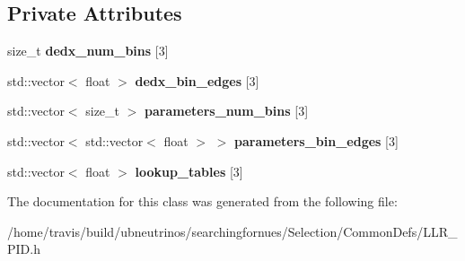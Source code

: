 \subsection*{Private Attributes}
\begin{DoxyCompactItemize}
\item 
size\+\_\+t {\bfseries dedx\+\_\+num\+\_\+bins} \mbox{[}3\mbox{]}\hypertarget{classsearchingfornues_1_1LLRPID_aa7d6cc52226bd9b52c83605c28bff6ea}{}\label{classsearchingfornues_1_1LLRPID_aa7d6cc52226bd9b52c83605c28bff6ea}

\item 
std\+::vector$<$ float $>$ {\bfseries dedx\+\_\+bin\+\_\+edges} \mbox{[}3\mbox{]}\hypertarget{classsearchingfornues_1_1LLRPID_a7737c601081b0794bf10639b073736ea}{}\label{classsearchingfornues_1_1LLRPID_a7737c601081b0794bf10639b073736ea}

\item 
std\+::vector$<$ size\+\_\+t $>$ {\bfseries parameters\+\_\+num\+\_\+bins} \mbox{[}3\mbox{]}\hypertarget{classsearchingfornues_1_1LLRPID_a16cf6fb36071fd876bb6d0fade4141f9}{}\label{classsearchingfornues_1_1LLRPID_a16cf6fb36071fd876bb6d0fade4141f9}

\item 
std\+::vector$<$ std\+::vector$<$ float $>$ $>$ {\bfseries parameters\+\_\+bin\+\_\+edges} \mbox{[}3\mbox{]}\hypertarget{classsearchingfornues_1_1LLRPID_a5fbeb32743ce2b01d944ceaf19086bb5}{}\label{classsearchingfornues_1_1LLRPID_a5fbeb32743ce2b01d944ceaf19086bb5}

\item 
std\+::vector$<$ float $>$ {\bfseries lookup\+\_\+tables} \mbox{[}3\mbox{]}\hypertarget{classsearchingfornues_1_1LLRPID_a33cb1049caaa153b9bc181983e89d7ea}{}\label{classsearchingfornues_1_1LLRPID_a33cb1049caaa153b9bc181983e89d7ea}

\end{DoxyCompactItemize}


The documentation for this class was generated from the following file\+:\begin{DoxyCompactItemize}
\item 
/home/travis/build/ubneutrinos/searchingfornues/\+Selection/\+Common\+Defs/L\+L\+R\+\_\+\+P\+I\+D.\+h\end{DoxyCompactItemize}
